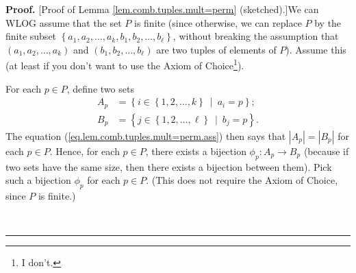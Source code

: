 \documentclass[numbers=enddot,12pt,final,onecolumn,notitlepage]{scrartcl}%
\numberwithin{exer}{subsection}
\theoremstyle{definition}
\newenvironment{fineprint}{\begin{small}}{\end{small}}
\newenvironment{proof}[1][Proof]{\noindent\textbf{#1.} }{\ \rule{0.5em}{0.5em}}
\begin{document}
\begin{fineprint}
\begin{proof}
[Proof of Lemma \ref{lem.comb.tuples.mult=perm} (sketched).]We can WLOG assume
that the set $P$ is finite (since otherwise, we can replace $P$ by the finite
subset $\left\{  a_{1},a_{2},\ldots,a_{k},b_{1},b_{2},\ldots,b_{\ell}\right\}
$, without breaking the assumption that $\left(  a_{1},a_{2},\ldots
,a_{k}\right)  $ and $\left(  b_{1},b_{2},\ldots,b_{\ell}\right)  $ are two
tuples of elements of $P$). Assume this (at least if you don't want to use the
Axiom of Choice\footnote{I don't.}).

For each $p\in P$, define two sets%
\begin{align*}
A_{p}  &  =\left\{  i\in\left\{  1,2,\ldots,k\right\}  \ \mid\ a_{i}%
=p\right\}  ;\\
B_{p}  &  =\left\{  j\in\left\{  1,2,\ldots,\ell\right\}  \ \mid
\ b_{j}=p\right\}  .
\end{align*}
The equation (\ref{eq.lem.comb.tuples.mult=perm.ass}) then says that
$\left\vert A_{p}\right\vert =\left\vert B_{p}\right\vert $ for each $p\in P$.
Hence, for each $p\in P$, there exists a bijection $\phi_{p}:A_{p}\rightarrow
B_{p}$ (because if two sets have the same size, then there exists a bijection
between them). Pick such a bijection $\phi_{p}$ for each $p\in P$. (This does
not require the Axiom of Choice, since $P$ is finite.)


\end{proof}
\end{fineprint}
\end{document}

